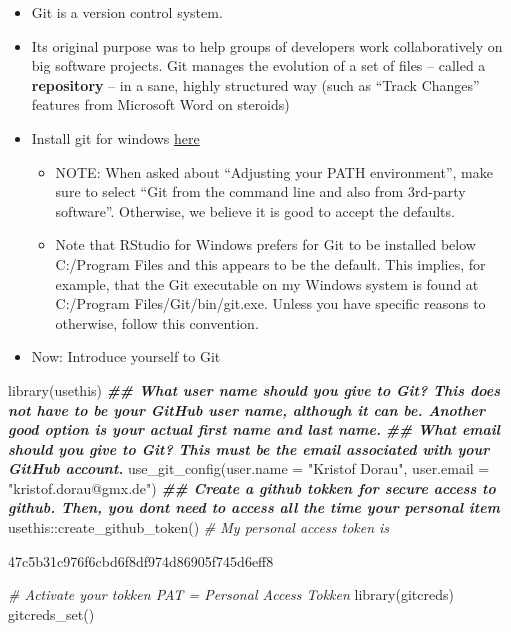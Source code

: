 \documentclass[
]{article}
\newenvironment{Shaded}{\begin{snugshade}}{\end{snugshade}}
\newcommand{\AttributeTok}[1]{\textcolor[rgb]{0.77,0.63,0.00}{#1}}
\newcommand{\CommentTok}[1]{\textcolor[rgb]{0.56,0.35,0.01}{\textit{#1}}}
\newcommand{\DocumentationTok}[1]{\textcolor[rgb]{0.56,0.35,0.01}{\textbf{\textit{#1}}}}
\newcommand{\FunctionTok}[1]{\textcolor[rgb]{0.00,0.00,0.00}{#1}}
\newcommand{\NormalTok}[1]{#1}
\newcommand{\SpecialCharTok}[1]{\textcolor[rgb]{0.00,0.00,0.00}{#1}}
\newcommand{\StringTok}[1]{\textcolor[rgb]{0.31,0.60,0.02}{#1}}
\providecommand{\tightlist}{%
  \setlength{\itemsep}{0pt}\setlength{\parskip}{0pt}}
\begin{document}
\begin{itemize}
\tightlist
\item
  Git is a version control system.
\item
  Its original purpose was to help groups of developers work
  collaboratively on big software projects. Git manages the evolution
  of a set of files -- called a \textbf{repository} -- in a sane, highly
  structured way (such as ``Track Changes'' features from Microsoft Word
  on steroids)
\item
  Install git for windows \href{https://gitforwindows.org/}{here}

  \begin{itemize}
  \tightlist
  \item
    NOTE: When asked about ``Adjusting your PATH environment'', make
    sure to select ``Git from the command line and also from
    3rd-party software''. Otherwise, we believe it is good to accept
    the defaults.
  \item
    Note that RStudio for Windows prefers for Git to be installed
    below C:/Program Files and this appears to be the default. This
    implies, for example, that the Git executable on my Windows
    system is found at C:/Program Files/Git/bin/git.exe. Unless you
    have specific reasons to otherwise, follow this convention.
  \end{itemize}
\item
  Now: Introduce yourself to Git
\end{itemize}

\begin{Shaded}
\begin{Highlighting}[]

\FunctionTok{library}\NormalTok{(usethis)}
\DocumentationTok{\#\# What user name should you give to Git? This does not have to be your GitHub user name, although it can be. Another good option is your actual first name and last name.}
\DocumentationTok{\#\# What email should you give to Git? This must be the email associated with your GitHub account.}
\FunctionTok{use\_git\_config}\NormalTok{(}\AttributeTok{user.name =} \StringTok{"Kristof Dorau"}\NormalTok{, }\AttributeTok{user.email =} \StringTok{"kristof.dorau@gmx.de"}\NormalTok{)}
\DocumentationTok{\#\# Create a github tokken for secure access to github. Then, you don\textquotesingle{}t need to access all the time your personal item}
\NormalTok{usethis}\SpecialCharTok{::}\FunctionTok{create\_github\_token}\NormalTok{()}
\CommentTok{\# My personal access token is}

\NormalTok{47c5b31c976f6cbd6f8df974d86905f745d6eff8 }

\CommentTok{\# Activate your tokken PAT = Personal Access Tokken}
\FunctionTok{library}\NormalTok{(gitcreds)}
\FunctionTok{gitcreds\_set}\NormalTok{()}
\end{Highlighting}
\end{Shaded}
\end{document}
